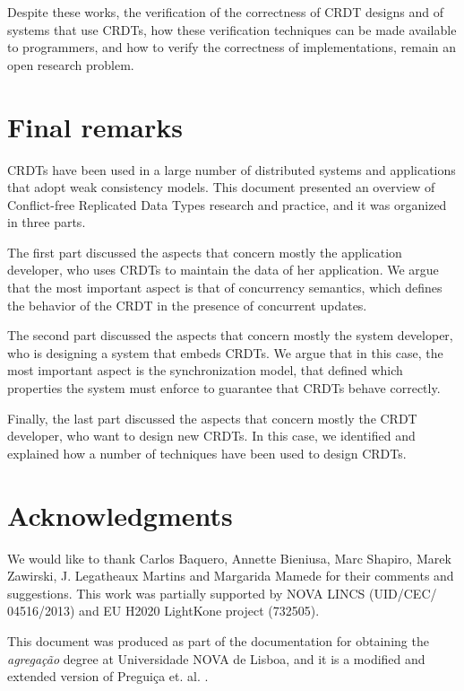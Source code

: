 \documentclass[11pt,a4paper]{article}
\begin{document}
Despite these works, the verification of the correctness of CRDT designs and
of systems that use CRDTs, how these verification techniques can be made available
to programmers, and how to verify the correctness of implementations, remain 
an open research problem.

\section{Final remarks}

CRDTs have been used in a large number of distributed systems and applications
that adopt weak consistency models. 
This document presented an overview of Conflict-free Replicated Data Types research 
and practice, and it was organized in three parts.

The first part discussed the aspects that concern mostly the application developer, 
who uses CRDTs to maintain the data of her application. We argue that the most
important aspect is that of concurrency semantics, which defines the behavior of
the CRDT in the presence of concurrent updates.

The second part discussed the aspects that concern mostly the system developer, 
who is designing a system that embeds CRDTs. We argue that in this case, the
most important aspect is the synchronization model, that defined which properties
the system must enforce to guarantee that CRDTs behave correctly.

Finally, the last part discussed the aspects that concern mostly the CRDT developer,
who want to design new CRDTs. In this case, we identified and explained how a 
number of techniques have been used to design CRDTs. 


\section*{Acknowledgments}

We would like to thank Carlos Baquero, Annette Bieniusa, Marc Shapiro, Marek Zawirski, 
J. Legatheaux Martins and Margarida Mamede for their comments and suggestions.
This work was partially supported by NOVA LINCS (UID/CEC/ 04516/2013) and 
EU H2020 LightKone project (732505).

This document was produced as part of the documentation for obtaining the 
\emph{agregação} degree at Universidade NOVA de Lisboa, and it is a modified and extended 
version of Preguiça et. al. \cite{crdt:enc}.



\end{document}
